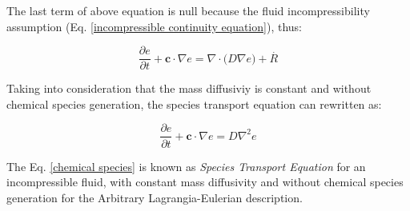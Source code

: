 \medskip
The last term of above equation is null because the
fluid incompressibility assumption
(Eq. \ref{incompressible continuity equation}),
thus:

\begin{equation}
 \frac{\partial e}{\partial t}
 +
 \textbf{c} \cdot \nabla e
 =
 \nabla \cdot \big( D \nabla e \big)
 +
 \overset{.}{R}
\end{equation}

\medskip
Taking into consideration that the mass diffusiviy
is constant and without chemical species
generation,
the species transport equation can rewritten as:

\begin{equation} \label{chemical species}
 \frac{\partial e}{\partial t}
 +
 \textbf{c} \cdot \nabla e
 =
 D \nabla^{2} e
\end{equation}

\medskip
The Eq. \ref{chemical species} is known as
\textit{Species Transport Equation}
for an incompressible fluid, with constant mass diffusivity
and without chemical species generation for the
Arbitrary Lagrangia-Eulerian description.
